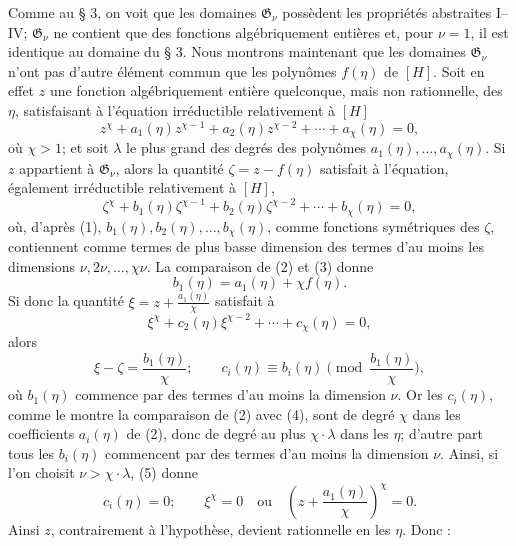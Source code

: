 Comme au \S{} 3, on voit que les domaines $\mathfrak G_\nu$ possèdent les propriétés abstraites I--IV; $\mathfrak G_\nu$ ne contient que des fonctions algébriquement entières et, pour $\nu=1$, il est identique au domaine du \S{} 3. Nous montrons maintenant que les domaines $\mathfrak G_\nu$ n'ont pas d'autre élément commun que les polynômes $f(\eta)$ de $[H]$. Soit en effet $z$ une fonction algébriquement entière quelconque, mais non rationnelle, des $\eta$, satisfaisant à l'équation irréductible relativement à $[H]$
\begin{equation}
z^\chi+a_1(\eta)z^{\chi-1}+a_2(\eta)z^{\chi-2}+\cdots+a_\chi(\eta)=0,
\tag{2}
\end{equation}
où $\chi>1$; et soit $\lambda$ le plus grand des degrés des polynômes $a_1(\eta),\ldots,a_\chi(\eta)$. Si $z$ appartient à $\mathfrak G_\nu$, alors la quantité $\zeta=z-f(\eta)$ satisfait à l'équation, également irréductible relativement à $[H]$,
\begin{equation}
\zeta^\chi+b_1(\eta)\zeta^{\chi-1}+b_2(\eta)\zeta^{\chi-2}+\cdots+b_\chi(\eta)=0,
\tag{3}
\end{equation}
où, d'après (1), $b_1(\eta),b_2(\eta),\ldots,b_\chi(\eta)$, comme fonctions symétriques des $\zeta$, contiennent comme termes de plus basse dimension des termes d'au moins les dimensions $\nu,2\nu,\ldots,\chi\nu$. La comparaison de (2) et (3) donne
\[
 b_1(\eta)=a_1(\eta)+\chi f(\eta).
\]
Si donc la quantité $\xi=z+\frac{a_1(\eta)}{\chi}$ satisfait à
\begin{equation}
\xi^\chi+c_2(\eta)\xi^{\chi-2}+\cdots+c_\chi(\eta)=0,
\tag{4}
\end{equation}
alors
\begin{equation}
 \xi-\zeta=\frac{b_1(\eta)}{\chi};
 \qquad
 c_i(\eta)\equiv b_i(\eta)\pmod{\frac{b_1(\eta)}{\chi}},
\tag{5}
\end{equation}
où $b_1(\eta)$ commence par des termes d'au moins la dimension $\nu$. Or les $c_i(\eta)$, comme le montre la comparaison de (2) avec (4), sont de degré $\chi$ dans les coefficients $a_i(\eta)$ de (2), donc de degré au plus $\chi\cdot\lambda$ dans les $\eta$; d'autre part tous les $b_i(\eta)$ commencent par des termes d'au moins la dimension $\nu$. Ainsi, si l'on choisit $\nu>\chi\cdot\lambda$, (5) donne
\[
 c_i(\eta)=0;\qquad
 \xi^\chi=0\quad\text{ou}\quad
 \left(z+\frac{a_1(\eta)}{\chi}\right)^\chi=0.
\]
Ainsi $z$, contrairement à l'hypothèse, devient rationnelle en les $\eta$. Donc :

